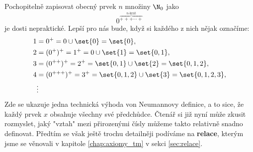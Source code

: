 Pochopitelně zapisovat obecný prvek $n$ množiny $\N_0$ jako
\begin{equation*}
    0^{\overbrace{+++\cdots+}^{n\text{-krát}}}
\end{equation*}
je dosti nepraktické. Lepší pro nás bude, když si každého z nich nějak označíme:
\begin{align*}
    1&=0^+=0\cup\set{0}=\set{0},\\
    2&=(0^+)^+=1^+=0\cup\set{1}=\set{0,1},\\
    3&=(0^{++})^+=2^+=\set{0,1}\cup\set{2}=\set{0,1,2},\\
    4&=(0^{+++})^+=3^+=\set{0,1,2}\cup\set{3}=\set{0,1,2,3},\\
    &\vdots
\end{align*}
Zde se ukazuje jedna technická výhoda von Neumannovy definice, a to sice, že každý prvek $x$ obsahuje všechny své předchůdce. Čtenář si již nyní může zkusit rozmyslet, jaký "vztah" mezi přirozenými čísly můžeme takto relativně snadno definovat. Předtím se však ještě trochu detailněji podíváme na \textbf{relace}, kterým jsme se věnovali v kapitole \ref{chap:axiomy_tm} v sekci \ref{sec:relace}.